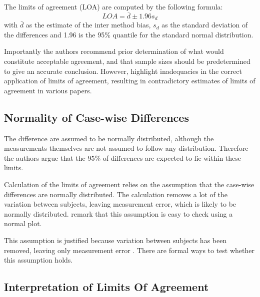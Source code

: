 \documentclass[12pt, a4paper]{report}
\theoremstyle{plain}
\theoremstyle{definition}
\theoremstyle{remark}
\begin{document}
The limits of agreement (LOA) are computed by the following
formula:
\[
LOA = \bar{d} \pm 1.96 s_{d}
\]
with $\bar{d}$ as the estimate of the inter method bias, $s_{d}$
as the standard deviation of the differences and 1.96 is the 95\%
quantile for the standard normal distribution. 

Importantly the authors recommend prior determination of what would constitute acceptable agreement, and that sample sizes should be predetermined to give an accurate conclusion. However, \citet{mantha} highlight inadequacies in the correct application of limits of agreement, resulting in contradictory estimates of limits of agreement in various papers.








\subsection{Normality of Case-wise Differences}	
The difference are assumed to be normally distributed, although the measurements themselves are not assumed to follow any distribution. Therefore the authors argue that the 95\% of differences are expected to lie within these limits. 

Calculation of the limits of agreement relies on the assumption that the case-wise differences are normally distributed.
The calculation removes a lot of the variation between subjects,  leaving measurement error, which is likely to be normally distributed. \citet{BA99} remark that this assumption is easy to check using a normal plot. 


This assumption is justified because variation between subjects has been removed, leaving only measurement error \citep{BA86}. There are formal ways to test whether this assumption holds.






\subsection{Interpretation of Limits Of Agreement}
\end{document}
